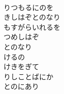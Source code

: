 \documentclass[10pt,b5j]{tarticle} %
\begin{document}
\begin{enumerate}
\begin{minipage}[c]{\blocksize}
        \vspace{\linespace}
        \item~\\
        りつもるにのを\\
        きしはぞとのなり\\
        もすがらいれるを\\
        つめしはぞ\\
        とのなり\\
        けるの\\
        けきをぎて\\
        りしことばにか\\
        とのにあり
    
    \end{minipage}
\end{enumerate} %
\end{document}
